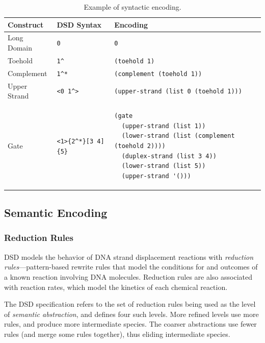 \documentclass{article}[10pt]
\begin{document}
\begin{table}[h]
\centering
\begin{tabular}{|l|l|l|} \hline
Construct     & DSD Syntax    & Encoding                      \\ \hline
Long Domain   & \verb;0;      & \verb;0;                      \\ \hline
Toehold       & \verb;1^;     & \verb;(toehold 1);            \\ \hline
Complement    & \verb;1^*;    & \verb;(complement (toehold 1)); \\ \hline
Upper Strand  & \verb;<0 1^>; & \verb;(upper-strand (list 0 (toehold 1))); \\
\hline
Gate          & \verb;<1>{2^*}[3 4]{5}; &
\begin{lstlisting}
(gate
  (upper-strand (list 1))
  (lower-strand (list (complement (toehold 2))))
  (duplex-strand (list 3 4))
  (lower-strand (list 5))
  (upper-strand '()))
\end{lstlisting}
\\
\hline
\end{tabular}
\caption{Example of syntactic encoding.}
\label{table:encoding-example}
\end{table}

\subsection{Semantic Encoding}
\subsubsection{Reduction Rules}
DSD models the behavior of DNA strand displacement reactions with
\emph{reduction rules}---pattern-based rewrite rules
that model the conditions for and outcomes of a known reaction
involving DNA molecules. Reduction rules are also associated with
reaction rates, which model the kinetics of each chemical reaction.

The DSD specification refers to the set of reduction rules being used
as the level of \emph{semantic abstraction}, and defines four such levels.
More refined levels
use more rules, and produce more intermediate species. The
coarser abstractions use fewer rules (and merge some rules together),
thus eliding intermediate species.
\end{document}
